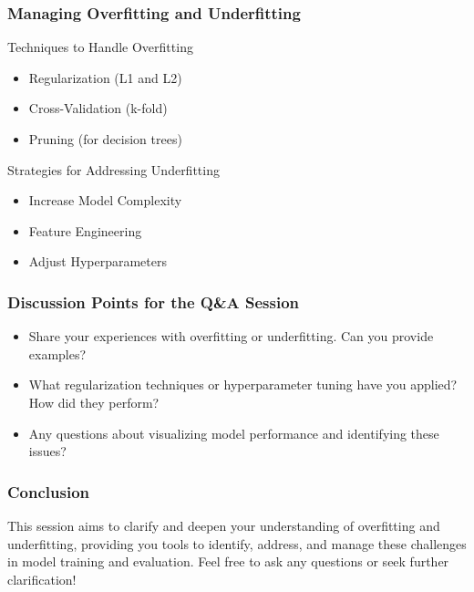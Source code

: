 \documentclass[aspectratio=169]{beamer}
\begin{document}
\begin{frame}[fragile]
    \frametitle{Managing Overfitting and Underfitting}
    \begin{block}{Techniques to Handle Overfitting}
        \begin{itemize}
            \item Regularization (L1 and L2)
            \item Cross-Validation (k-fold)
            \item Pruning (for decision trees)
        \end{itemize}
    \end{block}

    \begin{block}{Strategies for Addressing Underfitting}
        \begin{itemize}
            \item Increase Model Complexity
            \item Feature Engineering
            \item Adjust Hyperparameters
        \end{itemize}
    \end{block}
\end{frame}

\begin{frame}[fragile]
    \frametitle{Discussion Points for the Q\&A Session}
    \begin{itemize}
        \item Share your experiences with overfitting or underfitting. Can you provide examples?
        \item What regularization techniques or hyperparameter tuning have you applied? How did they perform?
        \item Any questions about visualizing model performance and identifying these issues?
    \end{itemize}
\end{frame}

\begin{frame}[fragile]
    \frametitle{Conclusion}
    This session aims to clarify and deepen your understanding of overfitting and underfitting, providing you tools to identify, address, and manage these challenges in model training and evaluation. 
    Feel free to ask any questions or seek further clarification!
\end{frame}
\end{document}
